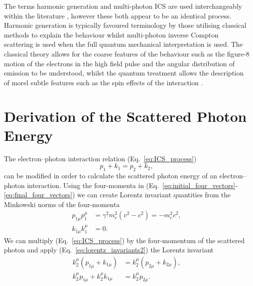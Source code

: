 \documentclass[../main.tex]{subfiles}
\begin{document}
The terms harmonic generation and multi-photon ICS are used interchangeably within the literature \cite{englert1983second}, however these both appear to be an identical process. Harmonic generation is typically favoured terminology by those utilising classical methods to explain the behaviour whilst multi-photon inverse Compton scattering is used when the full quantum mechanical interpretation is used. The classical theory \cite{sarachik1970classical} allows for the coarse features of the behaviour such as the figure-8 motion of the electrons in the high field pulse and the angular distribution of emission to be understood, whilst the quantum treatment \cite{brown1964interaction,kibble1965frequency} allows the description of morel subtle features such as the spin effects of the interaction \cite{seipt2011nonlinear}.    

\section{Derivation of the Scattered Photon Energy}
\label{sec:derivation_of_the_scattered_photon_energy}

The electron--photon interaction relation (Eq.~\ref{eq:ICS_process})
\begin{equation*}
p_{1} + k_{1} = p_{2} + k_{2},    
\end{equation*}
can be modified in order to calculate the scattered photon energy of an electron--photon interaction. Using the four-momenta in (Eq.~\ref{eq:initial_four_vectors}-\ref{eq:final_four_vectors}) we can create Lorentz invariant quantities from the Minkowski norms of the four-momenta 
\begin{align}
p_{1\mu}p_{1}^{\mu} &= \gamma^{2}m_{e}^{2}\left(v^{2}-c^{2}\right) = -m_{e}^{2}c^{2},
\label{eq:lorentz_invariants1} \\
k_{1\mu}k_{1}^{\mu} &= 0.
\label{eq:lorentz_invariants2}
\end{align}
We can multiply (Eq.~\ref{eq:ICS_process}) by the four-momentum  of the scattered photon and apply (Eq.~\ref{eq:lorentz_invariants2}) the Lorentz invariant 
\begin{align}
k_{2}^{\mu}\left(p_{1\mu} + k_{1\mu}\right) &= k_{2}^{\mu}\left(p_{2\mu} + k_{2\mu}\right), \nonumber\\
k_{2}^{\mu}p_{1\mu}+k_{2}^{\mu}k_{1\mu} &= k_{2}^{\mu}p_{2\mu}.
\label{eq:apply_photon_pfinal}
\end{align}
\end{document}
